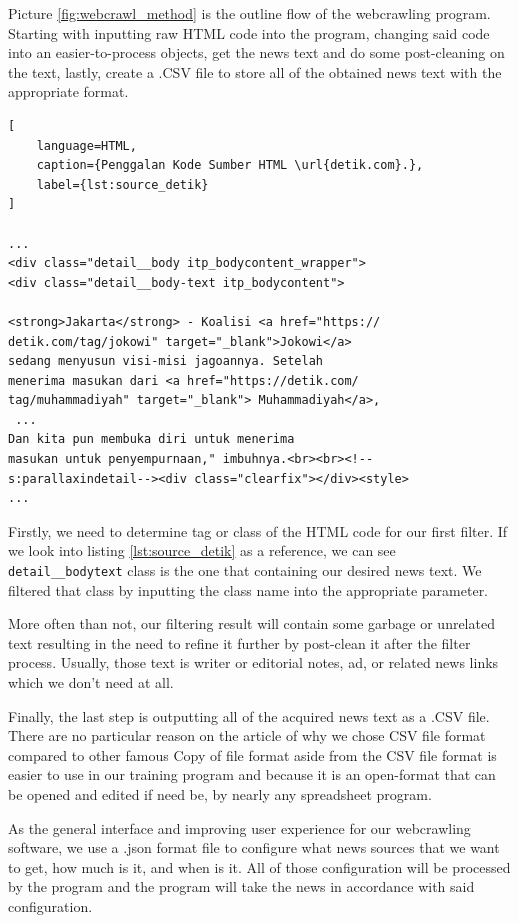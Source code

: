 Picture \ref{fig:webcrawl_method} is the outline flow of the webcrawling program. Starting with inputting raw HTML code into the program, changing said code into an easier-to-process objects, get the news text and do some post-cleaning on the text, lastly, create a .CSV file to store all of the obtained news text with the appropriate format.

\begin{lstlisting}[
    language=HTML, 
    caption={Penggalan Kode Sumber HTML \url{detik.com}.},
    label={lst:source_detik}
]

...
<div class="detail__body itp_bodycontent_wrapper">
<div class="detail__body-text itp_bodycontent">

<strong>Jakarta</strong> - Koalisi <a href="https://
detik.com/tag/jokowi" target="_blank">Jokowi</a> 
sedang menyusun visi-misi jagoannya. Setelah 
menerima masukan dari <a href="https://detik.com/
tag/muhammadiyah" target="_blank"> Muhammadiyah</a>,
 ... 
Dan kita pun membuka diri untuk menerima 
masukan untuk penyempurnaan," imbuhnya.<br><br><!--
s:parallaxindetail--><div class="clearfix"></div><style>
...

\end{lstlisting}

Firstly, we need to determine tag or class of the HTML code for our first filter. If we look into listing \ref{lst:source_detik} as a reference, we can see \texttt{detail\_\_body\-text} class is the one that containing our desired news text. We filtered that class by inputting the class name into the appropriate parameter.

More often than not, our filtering result will contain some garbage or unrelated text resulting in the need to refine it further by post-clean it after the filter process. Usually, those text is writer or editorial notes, ad, or related news links which we don't need at all.

Finally, the last step is outputting all of the acquired news text as a .CSV file. There are no particular reason on the article of why we chose CSV file format compared to other famous Copy of file format aside from the CSV file format is easier to use in our training program and because it is an open-format that can be opened and edited if need be, by nearly any spreadsheet program.

As the general interface and improving user experience for our webcrawling software, we use a .json format file to configure what news sources that we want to get, how much is it, and when is it. All of those configuration will be processed by the program and the program will take the news in accordance with said configuration.

